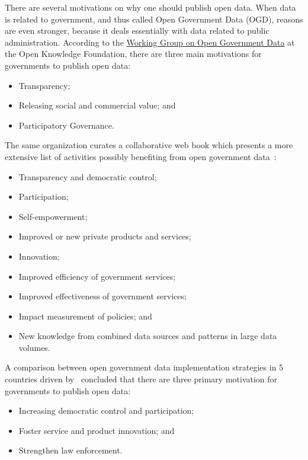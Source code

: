 There are several motivations on why one should publish open data.
When data is related to government, and thus called Open Government Data (OGD), reasons are even stronger, because it deals essentially with data related to public administration.
According to the \href{http://opengovernmentdata.org/}{Working Group on Open Government Data} at the Open Knowledge Foundation, there are three main motivations for governments to publish open data:

\begin{itemize}
	\item Transparency;
	\item Releasing social and commercial value; and
	\item Participatory Governance.
\end{itemize}

The same organization curates a collaborative web book which presents a more extensive list of activities possibly benefiting from open government data~\cite{OpenKnowledgeFoundation2015}:

\begin{itemize}
    \item Transparency and democratic control;
    \item Participation;
    \item Self-empowerment;
    \item Improved or new private products and services;
    \item Innovation;
    \item Improved efficiency of government services;
    \item Improved effectiveness of government services;
    \item Impact measurement of policies; and
    \item New knowledge from combined data sources and patterns in large data volumes.
\end{itemize}

A comparison between open government data implementation strategies in 5 countries driven by~ concluded that there are three primary motivation for governments to publish open data:

\begin{itemize}
	\item Increasing democratic control and participation;
	\item Foster service and product innovation; and
	\item Strengthen law enforcement.
\end{itemize}

